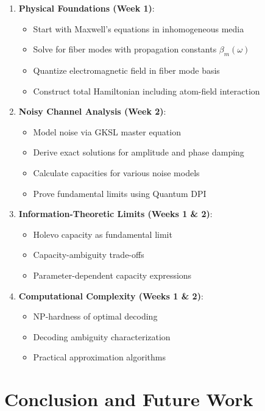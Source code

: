 \documentclass[12pt,a4paper]{article}
\begin{document}
\begin{enumerate}
    \item \textbf{Physical Foundations (Week 1)}:
    \begin{itemize}
        \item Start with Maxwell's equations in inhomogeneous media
        \item Solve for fiber modes with propagation constants $\beta_m(\omega)$
        \item Quantize electromagnetic field in fiber mode basis
        \item Construct total Hamiltonian including atom-field interaction
    \end{itemize}
    
    \item \textbf{Noisy Channel Analysis (Week 2)}:
    \begin{itemize}
        \item Model noise via GKSL master equation
        \item Derive exact solutions for amplitude and phase damping
        \item Calculate capacities for various noise models
        \item Prove fundamental limits using Quantum DPI
    \end{itemize}
    
    \item \textbf{Information-Theoretic Limits (Weeks 1 \& 2)}:
    \begin{itemize}
        \item Holevo capacity as fundamental limit
        \item Capacity-ambiguity trade-offs
        \item Parameter-dependent capacity expressions
    \end{itemize}
    
    \item \textbf{Computational Complexity (Weeks 1 \& 2)}:
    \begin{itemize}
        \item NP-hardness of optimal decoding
        \item Decoding ambiguity characterization
        \item Practical approximation algorithms
    \end{itemize}
\end{enumerate}

\section{Conclusion and Future Work}
\label{sec:conclusion}
\end{document}
